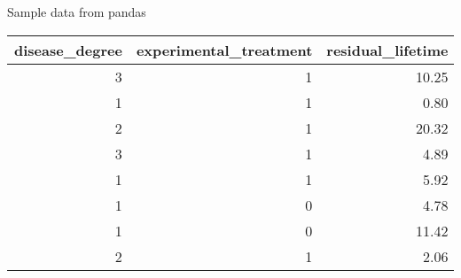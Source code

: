 \caption{Sample data from pandas}
\label{tab:sample_data}
\begin{tabular}{rrr}
\toprule
disease\_degree & experimental\_treatment & residual\_lifetime \\
\midrule
3 & 1 & 10.25 \\
1 & 1 & 0.80 \\
2 & 1 & 20.32 \\
3 & 1 & 4.89 \\
1 & 1 & 5.92 \\
1 & 0 & 4.78 \\
1 & 0 & 11.42 \\
2 & 1 & 2.06 \\
\bottomrule
\end{tabular}
